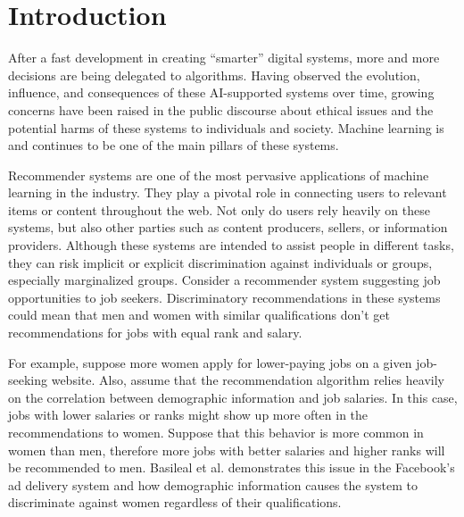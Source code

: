 \chapter{Introduction}
\label{ch:intro}




After a fast development in creating ``smarter'' digital systems, more and more decisions are being delegated to algorithms. Having observed the evolution, influence, and consequences of these AI-supported systems over time, growing concerns have been raised in the public discourse about ethical issues and the potential harms of these systems to individuals and society. Machine learning is and continues to be one of the main pillars of these systems.
 
Recommender systems are one of the most pervasive applications of machine learning in the industry. They play a pivotal role in connecting users to relevant items or content throughout the web. Not only do users rely heavily on these systems, but also other parties such as content producers, sellers, or information providers. Although these systems are intended to assist people in different tasks, they can risk implicit or explicit discrimination against individuals or groups, especially marginalized groups. Consider a recommender system suggesting job opportunities to job seekers. Discriminatory recommendations in these systems could mean that men and women with similar qualifications don't get recommendations for jobs with equal rank and salary.



For example, suppose more women apply for lower-paying jobs on a given job-seeking website. Also, assume that the recommendation algorithm relies heavily on the correlation between demographic information and job salaries. In this case, jobs with lower salaries or ranks might show up more often in the recommendations to women. Suppose that this behavior is more common in women than men, therefore more jobs with better salaries and higher ranks will be recommended to men. Basileal et al. \cite{Korolova2021JobAds} demonstrates this issue in the Facebook's ad delivery system and how demographic information causes the system to discriminate against women regardless of their qualifications.


